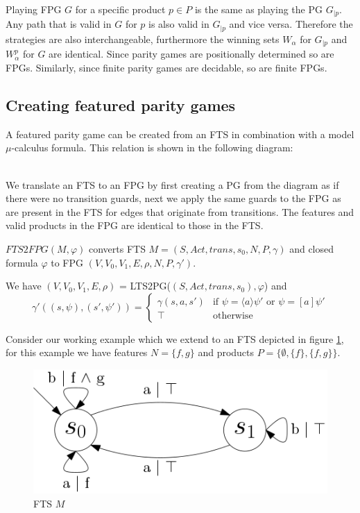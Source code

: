 Playing FPG $G$ for a specific product $p\in P$ is the same as playing the PG $G_{|p}$. Any path that is valid in $G$ for $p$ is also valid in $G_{|p}$ and vice versa. Therefore the strategies are also interchangeable, furthermore the winning sets $W_\alpha$ for $G_{|p}$ and $W_\alpha^p$ for $G$ are identical. Since parity games are positionally determined so are FPGs. Similarly, since finite parity games are decidable, so are finite FPGs.

\subsection{Creating featured parity games}
A featured parity game can be created from an FTS in combination with a model $\mu$-calculus formula. This relation is shown in the following diagram:
\\\\
We translate an FTS to an FPG by first creating a PG from the diagram as if there were no transition guards, next we apply the same guards to the FPG as are present in the FTS for edges that originate from transitions. The features and valid products in the FPG are identical to those in the FTS.
\begin{definition}
	\label{def_FTS2FPG}
	$FTS2FPG(M, \varphi)$ converts FTS $M = (S, Act, trans, s_0, N, P, \gamma)$ and closed formula $\varphi$ to FPG $(V, V_0, V_1, E, \rho, N, P, \gamma')$.
	
	We have $(V, V_0, V_1, E, \rho)$ = LTS2PG($(S, Act, trans, s_0), \varphi$) and
	\[ \gamma'((s, \psi),(s', \psi')) = \begin{cases}
	\gamma(s,a,s') & \text{if }\psi = \langle a \rangle \psi'\text{ or }\psi = [a]\psi' \\
	\top & \text{otherwise}
	\end{cases}\]
\end{definition}
Consider our working example which we extend to an FTS depicted in figure \ref{fig:exverfts}, for this example we have features $N = \{f, g\}$ and products $P = \{\emptyset, \{f\},\{f,g\}\}$.
\begin{figure}[h]
	\centering
	\includegraphics[scale=0.3]{Examples/ExamleVerification/FTS}
	\caption[FTS $M$]{FTS $M$}
	\label{fig:exverfts}
\end{figure}

